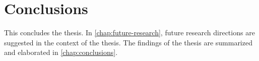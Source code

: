\documentclass{modernthesis}
\begin{document}
\part{Conclusions}
\label{part:conclusions}

This  concludes the thesis.
In \cref{chap:future-research}, future research directions are suggested in the context of the thesis.
The findings of the thesis are summarized and elaborated in \cref{chap:conclusions}.




\appendix

\backmatter


\label{chap:bibliography}

\printbibliography[
    heading=none,
    prenote=openaccess,
]

\end{document}
